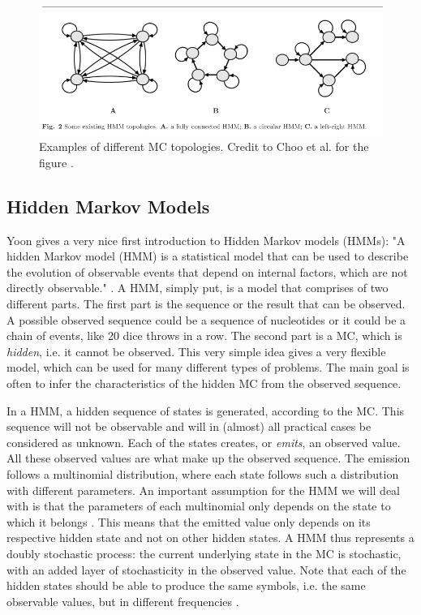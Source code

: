 \documentclass{article}\usepackage[]{graphicx}\usepackage[]{color}
\begin{document}
\begin{figure}
    \centering
    \includegraphics[width = \textwidth]{ChooHMMTopologies.png}
    \caption{Examples of different MC topologies. Credit to Choo et al. for the figure \cite{Choo2004}.}
    \label{fig:ChooTopologies}
\end{figure}

\subsection{Hidden Markov Models} \label{Section:HiddenMarkovModels}
Yoon gives a very nice first introduction to Hidden Markov models (HMMs): "A hidden Markov model (HMM) is a statistical model that can be used to describe the evolution of observable events that depend on internal factors, which are not directly observable." \cite{Yoon2009}. A HMM, simply put, is a model that comprises of two different parts. The first part is the sequence or the result that can be observed. A possible observed sequence could be a sequence of nucleotides or it could be a chain of events, like 20 dice throws in a row. The second part is a MC, which is \textit{hidden}, i.e. it cannot be observed. This very simple idea gives a very flexible model, which can be used for many different types of problems. The main goal is often to infer the characteristics of the hidden MC from the observed sequence. 

In a HMM, a hidden sequence of states is generated, according to the MC. This sequence will not be observable and will in (almost) all practical cases be considered as unknown. Each of the states creates, or \textit{emits}, an observed value. All these observed values are what make up the observed sequence. The emission follows a multinomial distribution, where each state follows such a distribution with different parameters. An important assumption for the HMM we will deal with is that the parameters of each multinomial only depends on the state to which it belongs \cite{Choo2004}. This means that the emitted value only depends on its respective hidden state and not on other hidden states. A HMM thus represents a doubly stochastic process: the current underlying state in the MC is stochastic, with an added layer of stochasticity in the observed value. Note that each of the hidden states should be able to produce the same symbols, i.e. the same observable values, but in different frequencies \cite{Christianini2006}.
\end{document}
